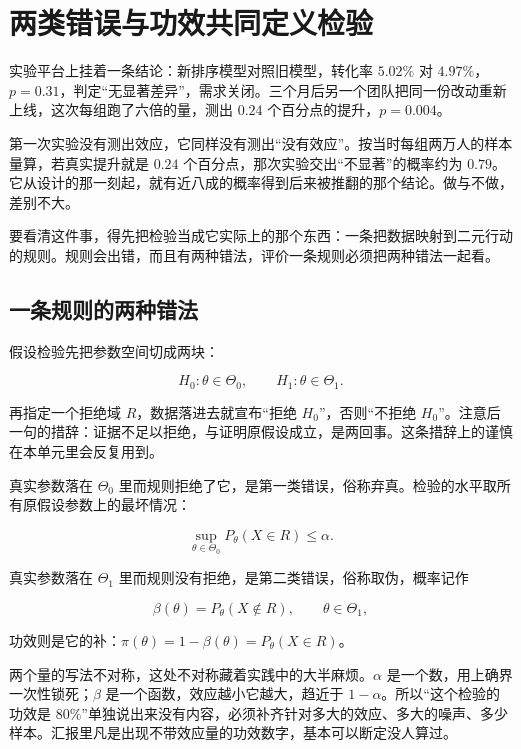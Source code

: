 \section{两类错误与功效共同定义检验}
\label{sec:11-Mathematical-Statistics/05-Hypothesis-Testing/01}

实验平台上挂着一条结论：新排序模型对照旧模型，转化率 \(5.02\%\) 对 \(4.97\%\)，\(p=0.31\)，判定``无显著差异''，需求关闭。三个月后另一个团队把同一份改动重新上线，这次每组跑了六倍的量，测出 \(0.24\) 个百分点的提升，\(p=0.004\)。

第一次实验没有测出效应，它同样没有测出``没有效应''。按当时每组两万人的样本量算，若真实提升就是 \(0.24\) 个百分点，那次实验交出``不显著''的概率约为 \(0.79\)。它从设计的那一刻起，就有近八成的概率得到后来被推翻的那个结论。做与不做，差别不大。

要看清这件事，得先把检验当成它实际上的那个东西：一条把数据映射到二元行动的规则。规则会出错，而且有两种错法，评价一条规则必须把两种错法一起看。

\subsection{一条规则的两种错法}

假设检验先把参数空间切成两块：

\[
H_0:\theta\in\Theta_0,
\qquad
H_1:\theta\in\Theta_1 .
\]

再指定一个拒绝域 \(R\)，数据落进去就宣布``拒绝 \(H_0\)''，否则``不拒绝 \(H_0\)''。注意后一句的措辞：证据不足以拒绝，与证明原假设成立，是两回事。这条措辞上的谨慎在本单元里会反复用到。

真实参数落在 \(\Theta_0\) 里而规则拒绝了它，是第一类错误，俗称弃真。检验的水平取所有原假设参数上的最坏情况：

\[
\sup_{\theta\in\Theta_0} P_\theta(X\in R)\le\alpha .
\]

真实参数落在 \(\Theta_1\) 里而规则没有拒绝，是第二类错误，俗称取伪，概率记作

\[
\beta(\theta)=P_\theta(X\notin R),\qquad \theta\in\Theta_1 ,
\]

功效则是它的补：\(\pi(\theta)=1-\beta(\theta)=P_\theta(X\in R)\)。

两个量的写法不对称，这处不对称藏着实践中的大半麻烦。\(\alpha\) 是一个数，用上确界一次性锁死；\(\beta\) 是一个函数，效应越小它越大，趋近于 \(1-\alpha\)。所以``这个检验的功效是 \(80\%\)''单独说出来没有内容，必须补齐针对多大的效应、多大的噪声、多少样本。汇报里凡是出现不带效应量的功效数字，基本可以断定没人算过。

